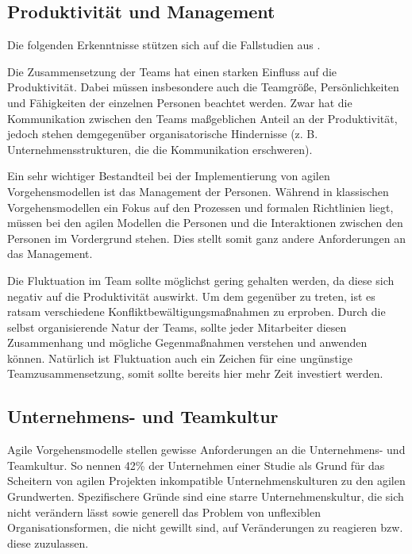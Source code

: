 \subsection{Produktivität und Management} %

Die folgenden Erkenntnisse stützen sich auf die Fallstudien aus \parencite[][S. 418 f.]{DeO.Melo:2013:ICS:2400747.2401010}.

Die Zusammensetzung der Teams hat einen starken Einfluss auf die Produktivität.
Dabei müssen insbesondere auch die Teamgröße, Persönlichkeiten und Fähigkeiten der einzelnen Personen beachtet werden.
Zwar hat die Kommunikation zwischen den Teams maßgeblichen Anteil an der Produktivität, jedoch stehen demgegenüber organisatorische Hindernisse (z. B. Unternehmensstrukturen, die die Kommunikation erschweren).

Ein sehr wichtiger Bestandteil bei der Implementierung von agilen Vorgehensmodellen ist das Management der Personen.
Während in klassischen Vorgehensmodellen ein Fokus auf den Prozessen und formalen Richtlinien liegt, müssen bei den agilen Modellen die Personen und die Interaktionen zwischen den Personen im Vordergrund stehen.
Dies stellt somit ganz andere Anforderungen an das Management.

Die Fluktuation im Team sollte möglichst gering gehalten werden, da diese sich negativ auf die Produktivität auswirkt. 
Um dem gegenüber zu treten, ist es ratsam verschiedene Konfliktbewältigungsmaßnahmen zu erproben.
Durch die selbst organisierende Natur der Teams, sollte jeder Mitarbeiter diesen Zusammenhang und mögliche Gegenmaßnahmen verstehen und anwenden können.
Natürlich ist Fluktuation auch ein Zeichen für eine ungünstige Teamzusammensetzung, somit sollte bereits hier mehr Zeit investiert werden.

\subsection{Unternehmens- und Teamkultur} %

Agile Vorgehensmodelle stellen gewisse Anforderungen an die Unternehmens- und Teamkultur.
So nennen 42\% der Unternehmen einer Studie als Grund für das Scheitern von agilen Projekten inkompatible Unternehmenskulturen zu den agilen Grundwerten. 
Spezifischere Gründe sind eine starre Unternehmenskultur, die sich nicht verändern lässt sowie generell das Problem von unflexiblen Organisationsformen, die nicht gewillt sind, auf Veränderungen zu reagieren bzw. diese zuzulassen.
\parencite[Vgl.][S. 10]{VersionOne:2015aa}

